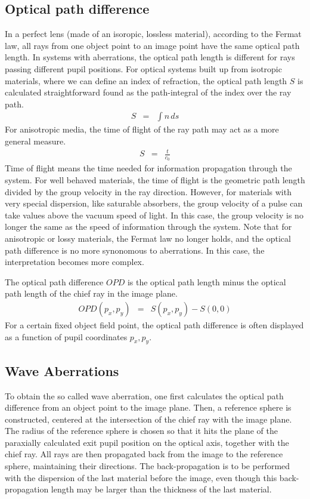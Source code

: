 \documentclass[12pt,a4paper,twoside,openright,BCOR10mm,headsepline,titlepage,abstracton,chapterprefix,final]{scrreprt}
\begin{document}
\subsection{Optical path difference}
In a perfect lens (made of an isoropic, lossless material), according to the Fermat law, all rays from one object point to an image point have the same optical path length. 
In systems with aberrations, the optical path length is different for rays passing different pupil positions.
For optical systems built up from isotropic materials, where we can define an index of refraction, the optical path length $S$ is calculated straightforward found as the path-integral of the index over the ray path.
\begin{eqnarray}
 S &=& \int n\, ds
\end{eqnarray}
For anisotropic media, the time of flight of the ray path may act as a more general measure.
\begin{eqnarray}
 S &=& \frac{t}{c_0}
\end{eqnarray}
Time of flight means the time needed for information propagation through the system.
For well behaved materials, the time of flight is the geometric path length divided by the group velocity in the ray direction. 
However, for materials with very special dispersion, like saturable absorbers, the group velocity of a pulse can take values above the vacuum speed of light. 
In this case, the group velocity is no longer the same as the speed of information through the system.
Note that for anisotropic or lossy materials, the Fermat law no longer holds, and the optical path difference is no more synonomous to aberrations.
In this case, the interpretation becomes more complex.

The optical path difference $OPD$ is the optical path length minus the optical path length of the chief ray in the image plane.
\begin{eqnarray}
 OPD(p_x,p_y) &=& S(p_x,p_y) - S(0,0)
\end{eqnarray}
For a certain fixed object field point, the optical path difference is often displayed as a function of pupil coordinates $p_x,p_y$.

\subsection{Wave Aberrations}
To obtain the so called wave aberration, one first calculates the optical path difference from an object point to the image plane.
Then, a reference sphere is constructed, centered at the intersection of the chief ray with the image plane.
The radius of the reference sphere is chosen so that it hits the plane of the paraxially calculated exit pupil position on the optical axis, together with the chief ray.
All rays are then propagated back from the image to the reference sphere, maintaining their directions.
The back-propagation is to be performed with the dispersion of the last material before the image, even though this back-propagation length may be larger than the thickness of the last material.
\end{document}
